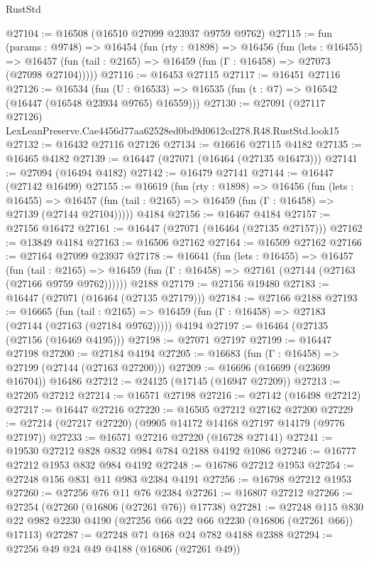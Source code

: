 \begin{lexlean}{RustStd}
\begin{coremodule}
@27104 := @16508 (@16510 @27099 @23937 @9759 @9762)
@27115 := fun (params : @9748) =>
  @16454
    (fun (rty : @1898) =>
    @16456
      (fun (lets : @16455) =>
      @16457 (fun (tail : @2165) => @16459 (fun (Γ : @16458) => @27073 (@27098 @27104)))))
@27116 := @16453 @27115
@27117 := @16451 @27116
@27126 := @16534
    (fun (U : @16533) => @16535 (fun (t : @7) => @16542 (@16447 (@16548 @23934 @9765) @16559)))
@27130 := @27091
    (@27117 @27126)
    LexLeanPreserve.Cae4456d77aa62528ed0bd9d0612cd278.R48.RustStd.look15
@27132 := @16432 @27116 @27126
@27134 := @16616 @27115 @4182
@27135 := @16465 @4182
@27139 := @16447 (@27071 (@16464 (@27135 @16473)))
@27141 := @27094 (@16494 @4182)
@27142 := @16479 @27141
@27144 := @16447 (@27142 @16499)
@27155 := @16619
    (fun (rty : @1898) =>
    @16456
      (fun (lets : @16455) =>
      @16457 (fun (tail : @2165) => @16459 (fun (Γ : @16458) => @27139 (@27144 @27104)))))
    @4184
@27156 := @16467 @4184
@27157 := @27156 @16472
@27161 := @16447 (@27071 (@16464 (@27135 @27157)))
@27162 := @13849 @4184
@27163 := @16506 @27162
@27164 := @16509 @27162
@27166 := @27164 @27099 @23937
@27178 := @16641
    (fun (lets : @16455) =>
    @16457
      (fun (tail : @2165) =>
      @16459 (fun (Γ : @16458) => @27161 (@27144 (@27163 (@27166 @9759 @9762))))))
    @2188
@27179 := @27156 @19480
@27183 := @16447 (@27071 (@16464 (@27135 @27179)))
@27184 := @27166 @2188
@27193 := @16665
    (fun (tail : @2165) => @16459 (fun (Γ : @16458) => @27183 (@27144 (@27163 (@27184 @9762)))))
    @4194
@27197 := @16464 (@27135 (@27156 (@16469 @4195)))
@27198 := @27071 @27197
@27199 := @16447 @27198
@27200 := @27184 @4194
@27205 := @16683 (fun (Γ : @16458) => @27199 (@27144 (@27163 @27200)))
@27209 := @16696 (@16699 (@23699 @16704)) @16486
@27212 := @24125 (@17145 (@16947 @27209))
@27213 := @27205 @27212
@27214 := @16571 @27198
@27216 := @27142 (@16498 @27212)
@27217 := @16447 @27216
@27220 := @16505 @27212 @27162 @27200
@27229 := @27214 (@27217 @27220) (@9905 @14172 @14168 @27197 @14179 (@9776 @27197))
@27233 := @16571 @27216 @27220 (@16728 @27141)
@27241 := @19530 @27212 @828 @832 @984 @784 @2188 @4192 @1086
@27246 := @16777 @27212 @1953 @832 @984 @4192
@27248 := @16786 @27212 @1953
@27254 := @27248 @156 @831 @11 @983 @2384 @4191
@27256 := @16798 @27212 @1953
@27260 := @27256 @76 @11 @76 @2384
@27261 := @16807 @27212
@27266 := @27254 (@27260 (@16806 (@27261 @76)) @17738)
@27281 := @27248
    @115
    @830
    @22
    @982
    @2230
    @4190
    (@27256 @66 @22 @66 @2230 (@16806 (@27261 @66)) @17113)
@27287 := @27248 @71 @168 @24 @782 @4188 @2388
@27294 := @27256 @49 @24 @49 @4188 (@16806 (@27261 @49))

\end{coremodule}
\end{lexlean}
